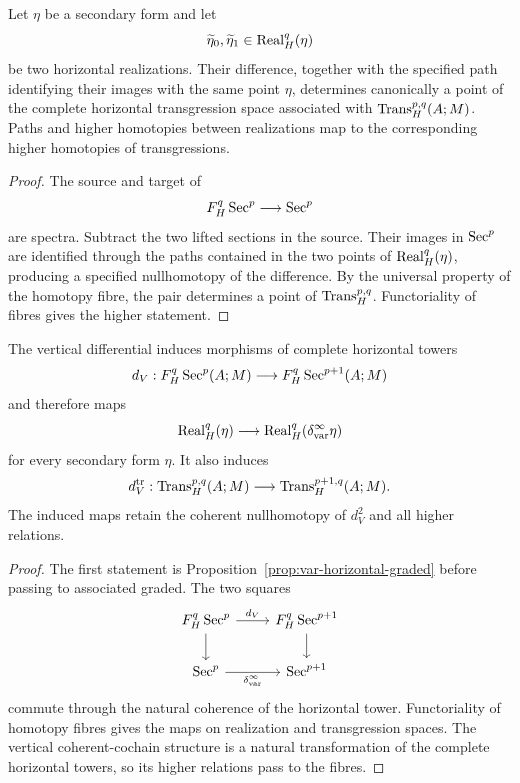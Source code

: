 \begin{proposition}
\label{prop:var-horizontal-differences}
Let \(\eta\) be a secondary form and let
\[
    \widetilde\eta_0,\widetilde\eta_1
    \in
    \operatorname{Real}_{H}^q(\eta)
\]
be two horizontal realizations. Their difference, together with the specified path identifying their images with the same point \(\eta\), determines canonically a point of the complete horizontal transgression space associated with \(\operatorname{Trans}_{H}^{p,q}(A;M)\). Paths and higher homotopies between realizations map to the corresponding higher homotopies of transgressions.
\end{proposition}

\begin{proof}
The source and target of
\[
    F_H^q\operatorname{Sec}^p\longrightarrow\operatorname{Sec}^p
\]
are spectra. Subtract the two lifted sections in the source. Their images in \(\operatorname{Sec}^p\) are identified through the paths contained in the two points of \(\operatorname{Real}_{H}^q(\eta)\), producing a specified nullhomotopy of the difference. By the universal property of the homotopy fibre, the pair determines a point of \(\operatorname{Trans}_{H}^{p,q}\). Functoriality of fibres gives the higher statement.
\end{proof}

\begin{proposition}
\label{prop:var-vertical-horizontal-realization}
The vertical differential induces morphisms of complete horizontal towers
\[
    d_V:
    F_H^q\operatorname{Sec}^p(A;M)
    \longrightarrow
    F_H^q\operatorname{Sec}^{p+1}(A;M)
\]
and therefore maps
\[
    \operatorname{Real}_{H}^q(\eta)
    \longrightarrow
    \operatorname{Real}_{H}^q(\delta^{\infty}_{\mathrm{var}}\eta)
\]
for every secondary form \(\eta\). It also induces
\[
    d_V^{\mathrm{tr}}:
    \operatorname{Trans}_{H}^{p,q}(A;M)
    \longrightarrow
    \operatorname{Trans}_{H}^{p+1,q}(A;M).
\]
The induced maps retain the coherent nullhomotopy of \(d_V^2\) and all higher relations.
\end{proposition}

\begin{proof}
The first statement is Proposition~\ref{prop:var-horizontal-graded} before passing to associated graded. The two squares
\[
\begin{tikzcd}
F_H^q\Sec^p \arrow[r,"d_V"] \arrow[d]
& F_H^q\Sec^{p+1} \arrow[d]
\\
\Sec^p \arrow[r,"\delta^{\infty}_{\mathrm{var}}"']
& \Sec^{p+1}
\end{tikzcd}
\]
commute through the natural coherence of the horizontal tower. Functoriality of homotopy fibres gives the maps on realization and transgression spaces. The vertical coherent-cochain structure is a natural transformation of the complete horizontal towers, so its higher relations pass to the fibres.
\end{proof}



